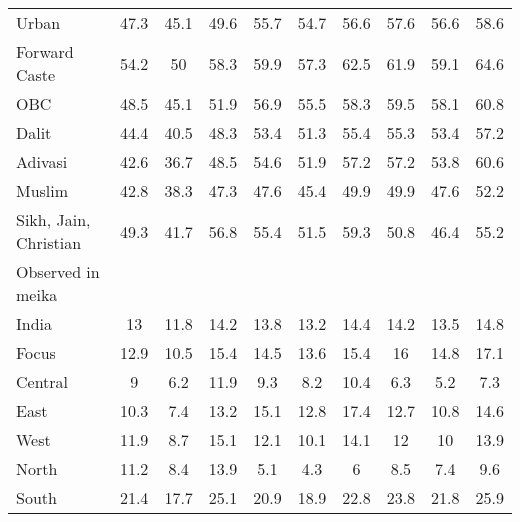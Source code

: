\begin{tabular}{l*{9}{c}}
Urban               &        47.3&        45.1&        49.6&        55.7&        54.7&        56.6&        57.6&        56.6&        58.6\\
Forward Caste       &        54.2&          50&        58.3&        59.9&        57.3&        62.5&        61.9&        59.1&        64.6\\
OBC                 &        48.5&        45.1&        51.9&        56.9&        55.5&        58.3&        59.5&        58.1&        60.8\\
Dalit               &        44.4&        40.5&        48.3&        53.4&        51.3&        55.4&        55.3&        53.4&        57.2\\
Adivasi             &        42.6&        36.7&        48.5&        54.6&        51.9&        57.2&        57.2&        53.8&        60.6\\
Muslim              &        42.8&        38.3&        47.3&        47.6&        45.4&        49.9&        49.9&        47.6&        52.2\\
Sikh, Jain, Christian&        49.3&        41.7&        56.8&        55.4&        51.5&        59.3&        50.8&        46.4&        55.2\\
\midrule
Observed in meika   &            &            &            &            &            &            &            &            &            \\
India               &          13&        11.8&        14.2&        13.8&        13.2&        14.4&        14.2&        13.5&        14.8\\
Focus               &        12.9&        10.5&        15.4&        14.5&        13.6&        15.4&          16&        14.8&        17.1\\
Central             &           9&         6.2&        11.9&         9.3&         8.2&        10.4&         6.3&         5.2&         7.3\\
East                &        10.3&         7.4&        13.2&        15.1&        12.8&        17.4&        12.7&        10.8&        14.6\\
West                &        11.9&         8.7&        15.1&        12.1&        10.1&        14.1&          12&          10&        13.9\\
North               &        11.2&         8.4&        13.9&         5.1&         4.3&           6&         8.5&         7.4&         9.6\\
South               &        21.4&        17.7&        25.1&        20.9&        18.9&        22.8&        23.8&        21.8&        25.9\\

\end{tabular}
